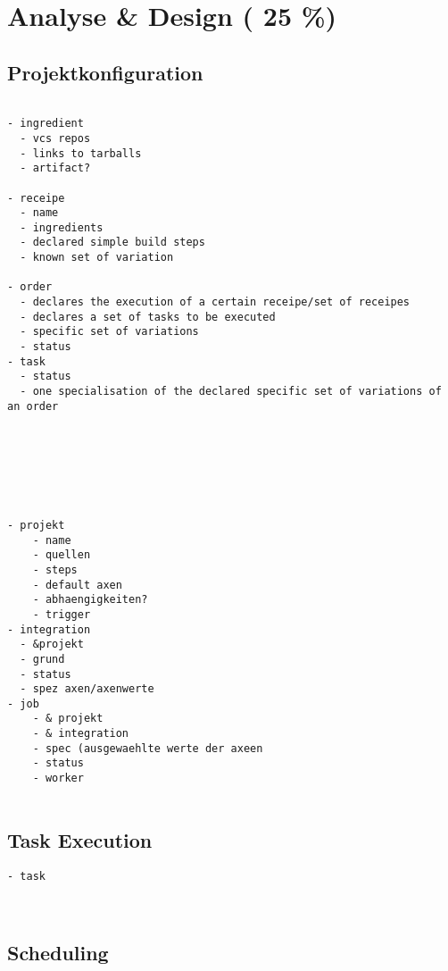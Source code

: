 \chapter{Analyse \& Design ( 25 \%)}


\section{Projektkonfiguration}


\begin{verbatim}

- ingredient
  - vcs repos
  - links to tarballs
  - artifact?

- receipe
  - name
  - ingredients
  - declared simple build steps
  - known set of variation

- order
  - declares the execution of a certain receipe/set of receipes
  - declares a set of tasks to be executed
  - specific set of variations
  - status
- task
  - status
  - one specialisation of the declared specific set of variations of an order







- projekt
    - name
    - quellen
    - steps
    - default axen
    - abhaengigkeiten?
    - trigger
- integration
  - &projekt
  - grund
  - status
  - spez axen/axenwerte
- job
    - & projekt
    - & integration
    - spec (ausgewaehlte werte der axeen
    - status
    - worker


\end{verbatim}



\section{Task Execution}

\begin{verbatim}
- task
  


\end{verbatim}


\section{Scheduling}
